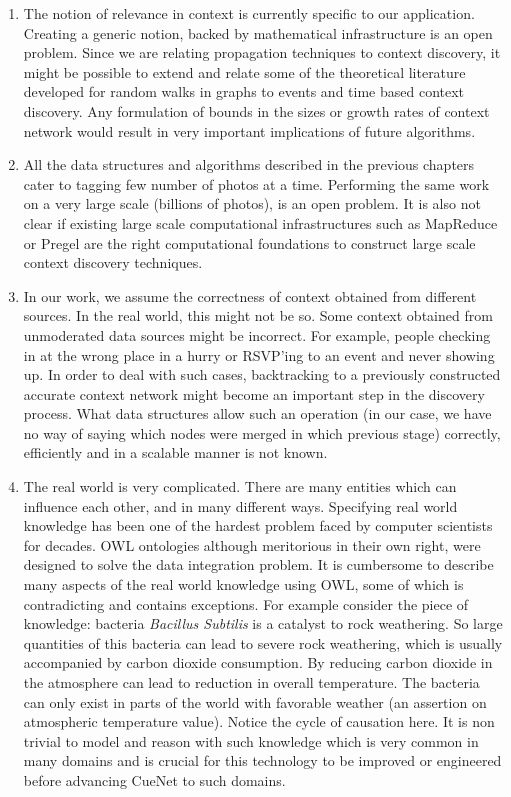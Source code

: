 \begin{enumerate}
\item The notion of relevance in context is currently specific to our application. Creating a generic notion, backed by mathematical infrastructure is an open problem. Since we are relating propagation techniques to context discovery, it might be possible to extend and relate some of the theoretical literature developed for random walks in graphs to events and time based context discovery. Any formulation of bounds in the sizes or growth rates of context network would result in very important implications of future algorithms.

\item All the data structures and algorithms described in the previous chapters cater to tagging few number of photos at a time. Performing the same work on a very large scale (billions of photos), is an open problem. It is also not clear if existing large scale computational infrastructures such as MapReduce or Pregel are the right computational foundations to construct large scale context discovery techniques.

\item In our work, we assume the correctness of context obtained from different sources. In the real world, this might not be so. Some context obtained from unmoderated data sources might be incorrect. For example, people checking in at the wrong place in a hurry or RSVP'ing to an event and never showing up. In order to deal with such cases, backtracking to a previously constructed accurate context network might become an important step in the discovery process. What data structures allow such an operation (in our case, we have no way of saying which nodes were merged in which previous stage) correctly, efficiently and in a scalable manner is not known.

\item The real world is very complicated. There are many entities which can influence each other, and in many different ways. Specifying real world knowledge has been one of the hardest problem faced by computer scientists for decades. OWL ontologies although meritorious in their own right, were designed to solve the data integration problem. It is cumbersome to describe many aspects of the real world knowledge using OWL, some of which is contradicting and contains exceptions. For example consider the piece of knowledge: bacteria \textit{Bacillus Subtilis} is a catalyst to rock weathering. So large quantities of this bacteria can lead to severe rock weathering, which is usually accompanied by carbon dioxide consumption. By reducing carbon dioxide in the atmosphere can lead to reduction in overall temperature. The bacteria can only exist in parts of the world with favorable weather (an assertion on atmospheric temperature value). Notice the cycle of causation here. It is non trivial to model and reason with such knowledge which is very common in many domains and is crucial for this technology to be improved or engineered before advancing CueNet to such domains.


\end{enumerate}
